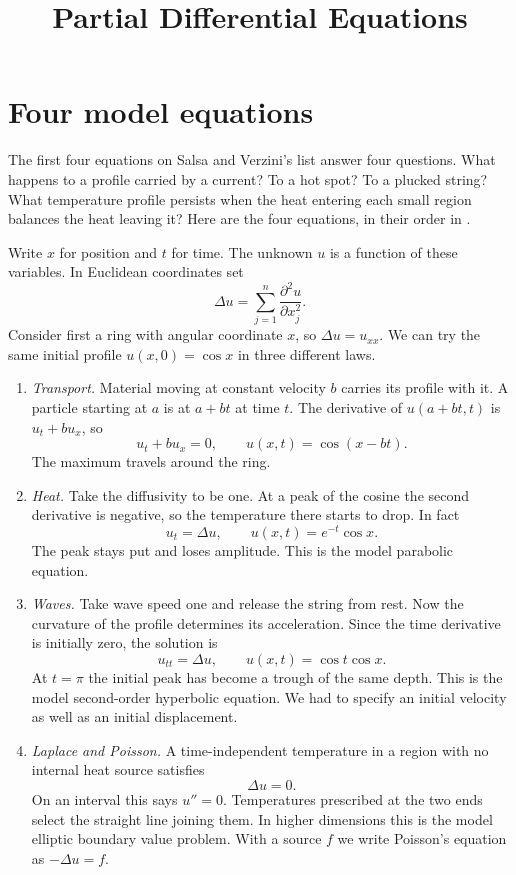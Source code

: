 



\title{Partial Differential Equations}
\maketitle

\label{section-phantom}

\tableofcontents

\section{Four model equations}
\label{section-introduction}

\noindent
The first four equations on Salsa and
Verzini's list answer four questions.
What happens to a
profile carried by a current? To a hot spot?
To a plucked string? What temperature
profile persists when the heat entering
each small region balances the heat
leaving it? Here are the
four equations, in their order in
\cite[Section 1.2, (1.2)--(1.5)]%
{salsa-verzini}.

Write $x$ for position and $t$ for time.
The unknown $u$ is a function of these
variables. In Euclidean coordinates set
$$
\Delta u=\sum_{j=1}^n
\frac{\partial^2 u}{\partial x_j^2}.
$$
Consider first a ring with angular
coordinate $x$, so $\Delta u=u_{xx}$.
We can try the same initial profile
$u(x,0)=\cos x$ in three different laws.

\begin{enumerate}
\item \emph{Transport.} Material moving at
constant velocity $b$ carries its profile
with it. A particle starting at $a$ is
at $a+bt$ at time $t$. The derivative
of $u(a+bt,t)$ is $u_t+bu_x$, so
$$
u_t+bu_x=0,\qquad u(x,t)=\cos(x-bt).
$$
The maximum travels around the ring.

\item \emph{Heat.} Take the diffusivity
to be one. At a peak of the cosine the
second derivative is negative, so the
temperature there starts to drop. In fact
$$
u_t=\Delta u,\qquad u(x,t)=e^{-t}\cos x.
$$
The peak stays put and loses amplitude.
This is the model parabolic equation.

\item \emph{Waves.} Take wave speed one
and release the string from rest. Now the
curvature of the profile determines its
acceleration. Since the time derivative
is initially zero, the solution is
$$
u_{tt}=\Delta u,\qquad u(x,t)=\cos t\cos x.
$$
At $t=\pi$ the initial peak has become a
trough of the same depth. This is the
model second-order hyperbolic equation.
We had to specify an initial velocity as
well as an initial displacement.

\item \emph{Laplace and Poisson.} A
time-independent temperature in a region
with no internal heat source satisfies
$$
\Delta u=0.
$$
On an interval this says $u''=0$.
Temperatures prescribed at the two ends
select the straight line joining them.
In higher dimensions this is the model
elliptic boundary value problem. With a
source $f$ we write Poisson's equation
as $-\Delta u=f$.
\end{enumerate}

